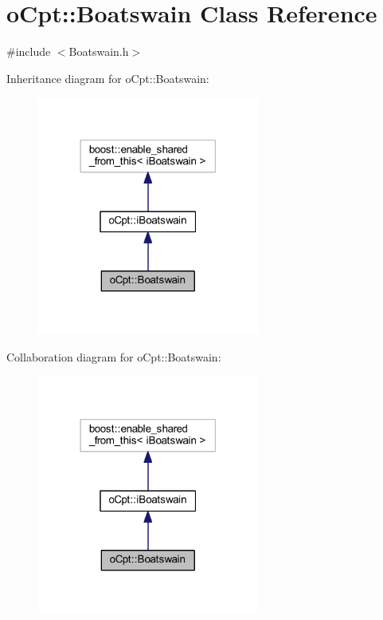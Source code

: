\hypertarget{classo_cpt_1_1_boatswain}{}\section{o\+Cpt\+:\+:Boatswain Class Reference}
\label{classo_cpt_1_1_boatswain}


{\ttfamily \#include $<$Boatswain.\+h$>$}



Inheritance diagram for o\+Cpt\+:\+:Boatswain\+:
\nopagebreak
\begin{figure}[H]
\begin{center}
\leavevmode
\includegraphics[width=207pt]{classo_cpt_1_1_boatswain__inherit__graph}
\end{center}
\end{figure}


Collaboration diagram for o\+Cpt\+:\+:Boatswain\+:
\nopagebreak
\begin{figure}[H]
\begin{center}
\leavevmode
\includegraphics[width=207pt]{classo_cpt_1_1_boatswain__coll__graph}
\end{center}
\end{figure}
